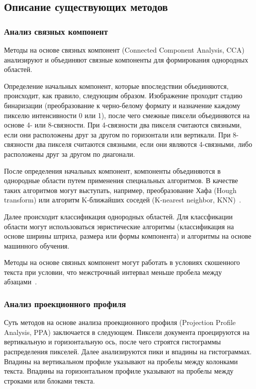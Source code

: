 \subsection{Описание существующих методов}


\subsubsection{Анализ связных компонент}

Методы на основе связных компонент (Connected Component Analysis, CCA) анализируют и объединяют связные компоненты для формирования однородных областей.

Определение начальных компонент, которые впоследствии объединяются, происходит, как правило, следующим образом.
Изображение проходит стадию бинаризации (преобразование к черно-белому формату и назначение каждому пикселю интенсивности 0 или 1), после чего смежные пиксели объединяются на основе 4- или 8-связности.
При 4-связности два пикселя считаются связными, если они расположены друг за другом по горизонтали или вертикали.
При 8-связности два пикселя считаются связными, если они являются 4-связными, либо расположены друг за другом по диагонали.

После определения начальных компонент, компоненты объединяются в однородные области путем применения специальных алгоритмов.
В качестве таких алгоритмов могут выступать, например, преобразование Хафа (Hough transform) или алгоритм K-ближайших соседей (K-nearest neighbor, KNN)~\cite{dla-book}.

Далее происходит классификация однородных областей.
Для классфикации области могут использоваться эвристические алгоритмы (классификация на основе ширины штриха, размера или формы компонента) и алгоритмы на основе машинного обучения.

Методы на основе связных компонент могут работать в условиях скошенного текста при условии, что межстрочный интервал меньше пробела между абзацами~\cite{dla-book}.

\subsubsection{Анализ проекционного профиля}

Суть методов на основе анализа проекционного профиля (Projection Profile Analysis, PPA) заключается в следующем.
Пиксели документа проецируются на вертикальную и горизонтальную ось, после чего строятся гистограммы распределения пикселей.
Далее анализируются пики и впадины на гистограммах.
Впадины на вертикальном профиле указывают на пробелы между колонками текста.
Впадины на горизонтальном профиле указывают на пробелы между строками или блоками текста.

